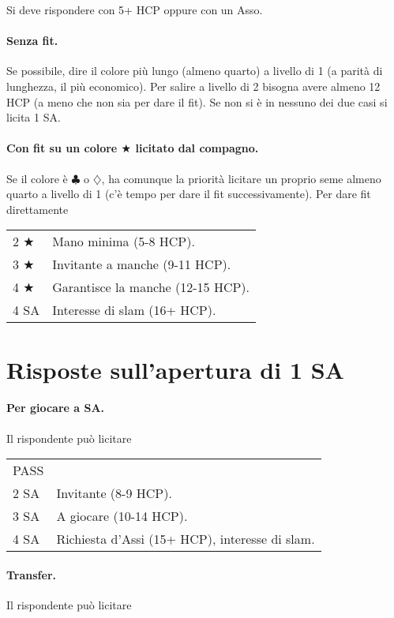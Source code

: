 \documentclass[a4paper,10pt]{article}
\renewcommand{\c}{$\clubsuit$\xspace}
\renewcommand{\d}{$\diamondsuit$\xspace}
\renewcommand{\j}{$\bigstar$\xspace}
\newcommand{\sa}{SA\xspace}
\newcommand{\smallspace}{\vskip0.3cm}
\newenvironment{twocol}
  {\smallspace\noindent\begin{tabular}{l p{0.78\textwidth}}}
  {\end{tabular}\smallspace}
\begin{document}
Si deve rispondere con 5+ HCP oppure con un Asso.

\paragraph{Senza fit.} Se possibile, dire il colore più lungo (almeno quarto) a livello di 1 (a parità di lunghezza, il più economico). Per salire a livello di 2 bisogna avere almeno 12 HCP (a meno che non sia per dare il fit). Se non si è in nessuno dei due casi si licita 1 \sa.%

\paragraph{Con fit su un colore \j licitato dal compagno.} Se il colore è \c o \d, ha comunque la priorità licitare un proprio seme almeno quarto a livello di 1 (c'è tempo per dare il fit successivamente). Per dare fit direttamente
\begin{twocol}
 2 \j & Mano minima (5-8 HCP).\\
 3 \j & Invitante a manche (9-11 HCP).\\
 4 \j & Garantisce la manche (12-15 HCP).\\
 4 \sa & Interesse di slam (16+ HCP).
\end{twocol}

\section{Risposte sull'apertura di 1 \sa}

\paragraph{Per giocare a \sa.} Il rispondente può licitare

\begin{twocol}
 PASS & \\
 2 \sa & Invitante (8-9 HCP).\\
 3 \sa & A giocare (10-14 HCP).\\
 4 \sa & Richiesta d'Assi (15+ HCP), interesse di slam.
\end{twocol}


\paragraph{Transfer.} Il rispondente può licitare
\end{document}
